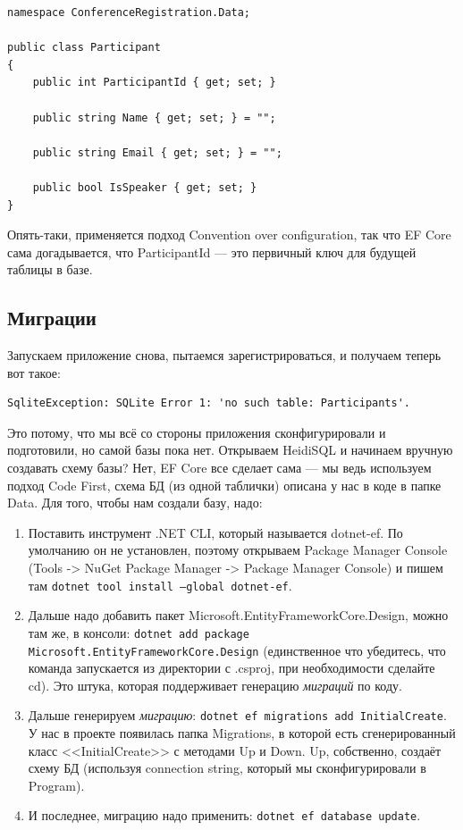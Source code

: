\documentclass[a5paper]{article}
\begin{document}
\begin{verbatim}
namespace ConferenceRegistration.Data;

public class Participant
{
    public int ParticipantId { get; set; }

    public string Name { get; set; } = "";

    public string Email { get; set; } = "";

    public bool IsSpeaker { get; set; }
}
\end{verbatim}

Опять-таки, применяется подход Convention over configuration, так что EF Core сама догадывается, что ParticipantId --- это первичный ключ для будущей таблицы в базе.

\subsection{Миграции}

Запускаем приложение снова, пытаемся зарегистрироваться, и получаем теперь вот такое:

\begin{verbatim}
SqliteException: SQLite Error 1: 'no such table: Participants'.
\end{verbatim}

Это потому, что мы всё со стороны приложения сконфигурировали и подготовили, но самой базы пока нет. Открываем HeidiSQL и начинаем вручную создавать схему базы? Нет, EF Core все сделает сама --- мы ведь используем подход Code First, схема БД (из одной таблички) описана у нас в коде в папке Data. Для того, чтобы нам создали базу, надо:

\begin{enumerate}
    \item Поставить инструмент .NET CLI, который называется dotnet-ef. По умолчанию он не установлен, поэтому открываем Package Manager Console (Tools -> NuGet Package Manager -> Package Manager Console) и пишем там \texttt{dotnet tool install --global dotnet-ef}.
    \item Дальше надо добавить пакет Microsoft.EntityFrameworkCore.Design, можно там же, в консоли: \texttt{dotnet add package Microsoft.EntityFrameworkCore.Design} (единственное что убедитесь, что команда запускается из директории с .csproj, при необходимости сделайте cd). Это штука, которая поддерживает генерацию \emph{миграций} по коду.
    \item Дальше генерируем \emph{миграцию}: \texttt{dotnet ef migrations add InitialCreate}. У нас в проекте появилась папка Migrations, в которой есть сгенерированный класс <<InitialCreate>> с методами Up и Down. Up, собственно, создаёт схему БД (используя connection string, который мы сконфигурировали в Program).
    \item И последнее, миграцию надо применить: \texttt{dotnet ef database update}.
\end{enumerate}
\end{document}
